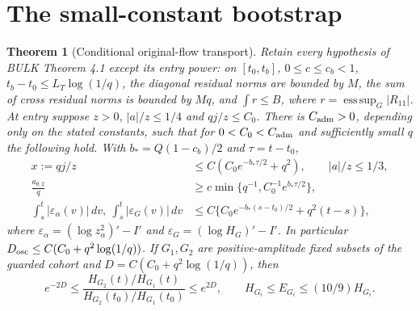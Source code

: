 \documentclass[11pt]{article}
\newtheorem{theorem}{Theorem}[section]
\newcommand{\dd}{\,d}
\begin{document}
\section{The small-constant bootstrap}
\begin{theorem}[Conditional original-flow transport]
\label{an03rcetv1:eta0}
Retain every hypothesis of BULK Theorem 4.1 except its entry power:
on $[t_0,t_b]$, $0\le c\le c_b<1$, $t_b-t_0\le L_T\log(1/q)$,
the diagonal residual norms are bounded by $M$, the sum of cross
residual norms is bounded by $Mq$, and
$\int r\le B$, where $r=\operatorname*{ess\,sup}_G|R_{11}|$.
At entry suppose $z>0$, $|a|/z\le1/4$ and $qj/z\le C_0$.
There is $C_{\rm adm}>0$, depending only on the stated constants,
such that for $0<C_0<C_{\rm adm}$ and sufficiently small $q$
the following hold. With $b_*=Q(1-c_b)/2$ and $\tau=t-t_0$,
\begin{align}
 x:=qj/z&\le C(C_0e^{-b_*\tau/2}+q^2),
 \qquad |a|/z\le1/3, \label{an03rcetv1:ratio}\\
 \frac{a_{\theta,2}}q&\ge c\min\{q^{-1},C_0^{-1}e^{b_*\tau/2}\},
 \label{an03rcetv1:margin}\\
 \int_s^t|\varepsilon_\alpha(v)|\dd v,
 \ \int_s^t|\varepsilon_G(v)|\dd v
 &\le C\{C_0e^{-b_*(s-t_0)/2}+q^2(t-s)\},
 \label{an03rcetv1:defect}
\end{align}
where $\varepsilon_\alpha=(\log z_\alpha^2)'-I'$ and
$\varepsilon_G=(\log H_G)'-I'$. In particular
$D_{\rm osc}\le C(C_0+q^2\log(1/q))$.
If $G_1,G_2$ are positive-amplitude fixed subsets of the guarded
cohort and $D=C(C_0+q^2\log(1/q))$, then
\begin{equation}\label{an03rcetv1:transport}
 e^{-2D}\le
 \frac{H_{G_2}(t)/H_{G_1}(t)}{H_{G_2}(t_0)/H_{G_1}(t_0)}
 \le e^{2D},\qquad H_{G_i}\le E_{G_i}\le(10/9)H_{G_i}.
\end{equation}
\end{theorem}
\end{document}
